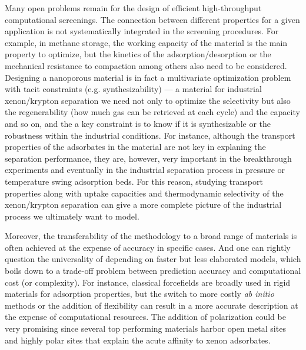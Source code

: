 \documentclass[main.tex]{subfiles}
\begin{document}
Many open problems remain for the design of efficient high-throughput computational screenings. The connection between different properties for a given application is not systematically integrated in the screening procedures. For example, in methane storage, the working capacity of the material is the main property to optimize, but the kinetics of the adsorption/desorption or the mechanical resistance to compaction among others also need to be considered. Designing a nanoporous material is in fact a multivariate optimization problem with tacit constraints (e.g. synthesizability) --- a material for industrial xenon/krypton separation \todo{}we need not only to optimize the selectivity but also the regenerability (how much gas can be retrieved at each cycle) and the capacity and so on, and the a key constraint is to know if it is synthesizable or the robustness within the industrial conditions. For instance, although the transport properties of the adsorbates in the material are not key in explaning the separation performance, they are, however, very important in the breakthrough experiments and eventually in the industrial separation process in pressure or temperature swing adsorption beds. For this reason, studying transport properties along with uptake capacities and thermodynamic selectivity of the xenon/krypton separation can give a more complete picture of the industrial process we ultimately want to model. 

Moreover, the transferability of the methodology to a broad range of materials is often achieved at the expense of accuracy in specific cases. And one can rightly question the universality of depending on faster but less elaborated models, which boils down to a trade-off problem between prediction accuracy and computational cost (or complexity). For instance, classical forcefields are broadly used in rigid materials for adsorption properties, but the switch to more costly \emph{ab initio} methods or the addition of flexibility can result in a more accurate description at the expense of computational resources. The addition of polarization could be very promising since several top performing materials harbor open metal sites and highly polar sites that explain the acute affinity to xenon adsorbates. 
\end{document}
